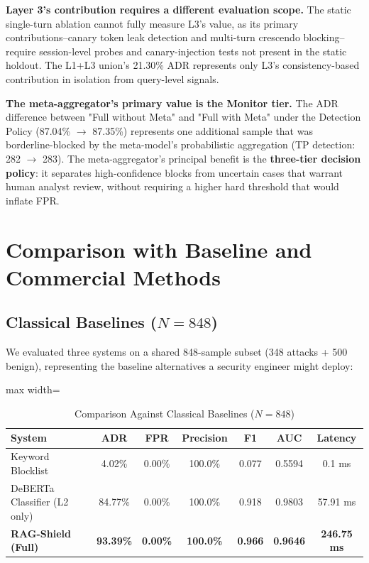 \documentclass[conference]{IEEEtran}
\begin{document}
\textbf{Layer 3's contribution requires a different evaluation scope.} The static single-turn ablation cannot fully measure L3's value, as its primary contributions--canary token leak detection and multi-turn crescendo blocking--require session-level probes and canary-injection tests not present in the static holdout. The L1+L3 union's 21.30\% ADR represents only L3's consistency-based contribution in isolation from query-level signals.


\textbf{The meta-aggregator's primary value is the Monitor tier.} The ADR difference between "Full without Meta" and "Full with Meta" under the Detection Policy (87.04\% $\to$ 87.35\%) represents one additional sample that was borderline-blocked by the meta-model's probabilistic aggregation (TP detection: 282 $\to$ 283). The meta-aggregator's principal benefit is the \textbf{three-tier decision policy}: it separates high-confidence blocks from uncertain cases that warrant human analyst review, without requiring a higher hard threshold that would inflate FPR.



\section{Comparison with Baseline and Commercial Methods}

\subsection{Classical Baselines ($N = 848$)}

We evaluated three systems on a shared 848-sample subset (348 attacks + 500 benign), representing the baseline alternatives a security engineer might deploy:



\begin{table}[!t]
\centering
\caption{Comparison Against Classical Baselines ($N = 848$)}
\label{tab:8}
\scriptsize
\begin{adjustbox}{max width=\textwidth}
\begin{tabular}{lcccccc}
\toprule
System & ADR & FPR & Precision & F1 & AUC & Latency \\
\midrule
Keyword Blocklist & 4.02\% & 0.00\% & 100.0\% & 0.077 & 0.5594 & 0.1 ms \\
DeBERTa Classifier (L2 only) & 84.77\% & 0.00\% & 100.0\% & 0.918 & 0.9803 & 57.91 ms \\
\textbf{RAG-Shield (Full)} & \textbf{93.39\%} & \textbf{0.00\%} & \textbf{100.0\%} & \textbf{0.966} & \textbf{0.9646} & \textbf{246.75 ms} \\
\bottomrule
\end{tabular}
\end{adjustbox}
\end{table}
\end{document}
